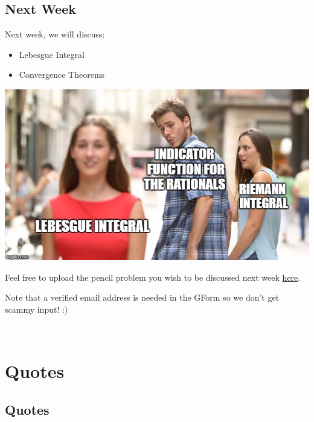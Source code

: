 \documentclass[
  letterpaper,
  DIV=11,
  numbers=noendperiod]{scrreprt}
\providecommand{\tightlist}{%
  \setlength{\itemsep}{0pt}\setlength{\parskip}{0pt}}\usepackage{longtable,booktabs,array}
\theoremstyle{definition}
\theoremstyle{plain}
\theoremstyle{remark}
\begin{document}
\hypertarget{next-week-2}{%
\section*{Next Week}\label{next-week-2}}


Next week, we will discuss:

\begin{itemize}
\tightlist
\item
  Lebesgue Integral
\item
  Convergence Theorems
\end{itemize}

\includegraphics{./assets/img/lebesgue.jpeg}

Feel free to upload the pencil problem you wish to be discussed next
week \href{https://forms.gle/RBmMNYJp4u3qD5W79}{here}.

Note that a verified email address is needed in the GForm so we don't
get scammy input! :)

\(\,\)


\hypertarget{quotes}{%
\chapter*{Quotes}\label{quotes}}


\hypertarget{quotes-1}{%
\section*{Quotes}\label{quotes-1}}
\end{document}
